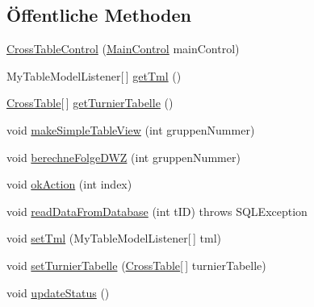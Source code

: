 \subsection*{Öffentliche Methoden}
\begin{DoxyCompactItemize}
\item 
\hyperlink{classde_1_1turnierverwaltung_1_1control_1_1_cross_table_control_a791541b08f66e22c354db7741979217a}{Cross\+Table\+Control} (\hyperlink{classde_1_1turnierverwaltung_1_1control_1_1_main_control}{Main\+Control} main\+Control)
\item 
My\+Table\+Model\+Listener\mbox{[}$\,$\mbox{]} \hyperlink{classde_1_1turnierverwaltung_1_1control_1_1_cross_table_control_a616f2837d12519fa3c43a42857c8befe}{get\+Tml} ()
\item 
\hyperlink{classde_1_1turnierverwaltung_1_1model_1_1_cross_table}{Cross\+Table}\mbox{[}$\,$\mbox{]} \hyperlink{classde_1_1turnierverwaltung_1_1control_1_1_cross_table_control_a1963ebcee18164b57a8782cf456538b5}{get\+Turnier\+Tabelle} ()
\item 
void \hyperlink{classde_1_1turnierverwaltung_1_1control_1_1_cross_table_control_a73d8150172789a37bd2a06e1067ea079}{make\+Simple\+Table\+View} (int gruppen\+Nummer)
\item 
void \hyperlink{classde_1_1turnierverwaltung_1_1control_1_1_cross_table_control_a5e8312d3be4002a9658cb601906404f8}{berechne\+Folge\+D\+WZ} (int gruppen\+Nummer)
\item 
void \hyperlink{classde_1_1turnierverwaltung_1_1control_1_1_cross_table_control_a30b66d54d4b01ab45e8d95e6d36e0882}{ok\+Action} (int index)
\item 
void \hyperlink{classde_1_1turnierverwaltung_1_1control_1_1_cross_table_control_a6f5c038b4d79674719803e62fdb9e60a}{read\+Data\+From\+Database} (int t\+ID)  throws S\+Q\+L\+Exception 
\item 
void \hyperlink{classde_1_1turnierverwaltung_1_1control_1_1_cross_table_control_ad3bf4c55d2daffa4b3fda27a4475adf4}{set\+Tml} (My\+Table\+Model\+Listener\mbox{[}$\,$\mbox{]} tml)
\item 
void \hyperlink{classde_1_1turnierverwaltung_1_1control_1_1_cross_table_control_a1de20858ade191c34d0bf3609a8dc2f5}{set\+Turnier\+Tabelle} (\hyperlink{classde_1_1turnierverwaltung_1_1model_1_1_cross_table}{Cross\+Table}\mbox{[}$\,$\mbox{]} turnier\+Tabelle)
\item 
void \hyperlink{classde_1_1turnierverwaltung_1_1control_1_1_cross_table_control_a022c212cb5b0aa618c03c6ffb9e0432b}{update\+Status} ()
\end{DoxyCompactItemize}


